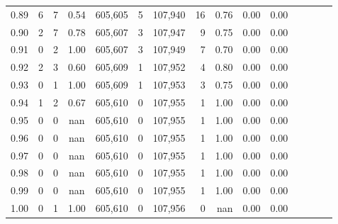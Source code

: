 \begin{tabular}{rrrcrrrrrrrrrrr}
0.89 &       6 &      7 &                                       0.54 &  605,605 &        5 &  107,940 &       16 &  0.76 &  0.00 &                         0.00 \\
0.90 &       2 &      7 &                                       0.78 &  605,607 &        3 &  107,947 &        9 &  0.75 &  0.00 &                         0.00 \\
0.91 &       0 &      2 &                                       1.00 &  605,607 &        3 &  107,949 &        7 &  0.70 &  0.00 &                         0.00 \\
0.92 &       2 &      3 &                                       0.60 &  605,609 &        1 &  107,952 &        4 &  0.80 &  0.00 &                         0.00 \\
0.93 &       0 &      1 &                                       1.00 &  605,609 &        1 &  107,953 &        3 &  0.75 &  0.00 &                         0.00 \\
0.94 &       1 &      2 &                                       0.67 &  605,610 &        0 &  107,955 &        1 &  1.00 &  0.00 &                         0.00 \\
0.95 &       0 &      0 &                                        nan &  605,610 &        0 &  107,955 &        1 &  1.00 &  0.00 &                         0.00 \\
0.96 &       0 &      0 &                                        nan &  605,610 &        0 &  107,955 &        1 &  1.00 &  0.00 &                         0.00 \\
0.97 &       0 &      0 &                                        nan &  605,610 &        0 &  107,955 &        1 &  1.00 &  0.00 &                         0.00 \\
0.98 &       0 &      0 &                                        nan &  605,610 &        0 &  107,955 &        1 &  1.00 &  0.00 &                         0.00 \\
0.99 &       0 &      0 &                                        nan &  605,610 &        0 &  107,955 &        1 &  1.00 &  0.00 &                         0.00 \\
1.00 &       0 &      1 &                                       1.00 &  605,610 &        0 &  107,956 &        0 &   nan &  0.00 &                         0.00 \\
\bottomrule
\end{tabular}
